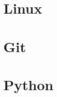 



\begin{frame}
   \titlepage
\end{frame}

\begin{frame}
   \tableofcontents
\end{frame}

\section{Linux}
\section{Git}
\section{Python}




